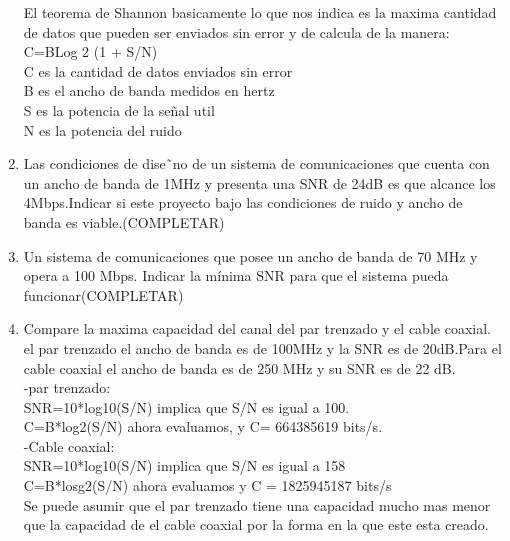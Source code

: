 \documentclass{udparticle}
\begin{document}
\begin{enumerate}
    El teorema de Shannon basicamente lo que nos indica es la maxima cantidad de datos que pueden ser enviados sin error y de calcula de la manera:\\
            C=BLog 2 (1 + S/N)\\
            C es la cantidad de datos enviados sin error\\
            B es el ancho de banda medidos en hertz\\
            S es la potencia de la señal util\\
            N es la potencia del ruido\\
    \item  Las condiciones de dise˜no de un sistema de comunicaciones que cuenta con un ancho de banda de 1MHz y presenta una SNR de 24dB es que alcance los 4Mbps.Indicar si este proyecto bajo las condiciones de ruido y ancho de banda es viable.(COMPLETAR) \\
    \item Un sistema de comunicaciones que posee un ancho de banda de 70 MHz y opera a 100 Mbps. Indicar la mínima SNR para que el sistema pueda funcionar(COMPLETAR) \\
    \item  Compare la maxima capacidad del canal del par trenzado y el cable coaxial. el par trenzado el ancho de banda es de 100MHz y la SNR es de 20dB.Para el cable coaxial el ancho de banda es de 250 MHz y su SNR es de 22 dB.\\
    	-par trenzado:\\
    		SNR=10*log10(S/N) implica que S/N es igual a 100.\\
    		C=B*log2(S/N) ahora evaluamos, y C= 664385619 bits/s.\\
    	-Cable coaxial:\\
    		SNR=10*log10(S/N) implica que S/N es igual a 158  \\
    		C=B*losg2(S/N) ahora evaluamos y C = 1825945187 bits/s\\
    	Se puede asumir que el par trenzado tiene una capacidad mucho mas menor que la capacidad de el cable coaxial por la forma
    	en la que este esta creado.
    

\end{enumerate}
\end{document}
